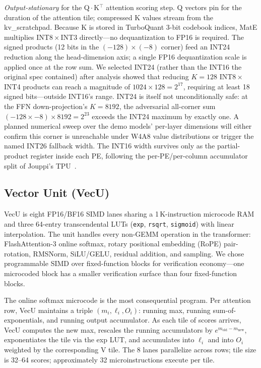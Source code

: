 \documentclass[conference]{IEEEtran}
\begin{document}
\textit{Output-stationary} for the Q\,$\cdot$\,K$^\top$ attention scoring step. Q vectors pin for the duration of the attention tile; compressed K values stream from the kv\_scratchpad. Because K is stored in TurboQuant 3-bit codebook indices, MatE multiplies INT8\,$\times$\,INT3 directly---no dequantization to FP16 is required. The signed products (12 bits in the $(-128)\times(-8)$ corner) feed an INT24 reduction along the head-dimension axis; a single FP16 dequantization scale is applied once at the row sum. We selected INT24 (rather than the INT16 the original spec contained) after analysis showed that reducing $K{=}128$ INT8\,$\times$\,INT4 products can reach a magnitude of $1024 \times 128 = 2^{17}$, requiring at least 18 signed bits---outside INT16's range. INT24 is itself not unconditionally safe: at the FFN down-projection's $K{=}8192$, the adversarial all-corner sum $(-128 \times -8) \times 8192 = 2^{23}$ exceeds the INT24 maximum by exactly one. A planned numerical sweep over the demo models' per-layer dimensions will either confirm this corner is unreachable under W4A8 value distributions or trigger the named INT26 fallback width. The INT16 width survives only as the partial-product register inside each PE, following the per-PE/per-column accumulator split of Jouppi's TPU~\cite{jouppi_tpu,tpu_v4}.

\subsection{Vector Unit (VecU)}

VecU is eight FP16/BF16 SIMD lanes sharing a 1\,K-instruction microcode RAM and three 64-entry transcendental LUTs (\texttt{exp}, \texttt{rsqrt}, \texttt{sigmoid}) with linear interpolation. The unit handles every non-GEMM operation in the transformer: FlashAttention-3 online softmax, rotary positional embedding (RoPE) pair-rotation, RMSNorm, SiLU/GELU, residual addition, and sampling. We chose programmable SIMD over fixed-function blocks for verification economy---one microcoded block has a smaller verification surface than four fixed-function blocks.

The online softmax microcode is the most consequential program. Per attention row, VecU maintains a triple $(m_i, \ell_i, O_i)$: running max, running sum-of-exponentials, and running output accumulator. As each tile of scores arrives, VecU computes the new max, rescales the running accumulators by $e^{m_{\mathrm{old}} - m_{\mathrm{new}}}$, exponentiates the tile via the exp LUT, and accumulates into $\ell_i$ and into $O_i$ weighted by the corresponding V tile. The 8 lanes parallelize across rows; tile size is 32--64 scores; approximately 32 microinstructions execute per tile.
\end{document}
